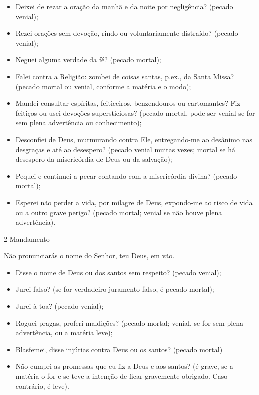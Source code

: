 \documentclass{book}
\begin{document}
\begin{itemize}
    \item Deixei de rezar a oração da manhã e da noite por negligência? (pecado venial);
    \item Rezei orações sem devoção, rindo ou voluntariamente distraído? (pecado venial);
    \item Neguei alguma verdade da fé? (pecado mortal);
    \item Falei contra a Religião: zombei de coisas santas, p.ex., da Santa Missa? (pecado mortal ou venial, conforme a matéria e o modo);
    \item Mandei consultar espíritas, feiticeiros, benzendouros ou cartomantes? Fiz feitiços ou usei devoções supersticiosas? (pecado mortal, pode ser venial se for sem plena advertência ou conhecimento);
    \item Desconfiei de Deus, murmurando contra Ele, entregando-me ao desânimo nas desgraças e até ao desespero? (pecado venial muitas vezes; mortal se há desespero da misericórdia de Deus ou da salvação);
    \item Pequei e continuei a pecar contando com a misericórdia divina? (pecado mortal);
    \item Esperei não perder a vida, por milagre de Deus, expondo-me ao risco de vida ou a outro grave perigo? (pecado mortal; venial se não houve plena advertência).
\end{itemize}
\newpage
\begin{center}
    2\textordmasculine{} Mandamento
\end{center}
\begin{flushleft}
    Não pronunciarás o nome do Senhor, teu Deus, em vão.
\end{flushleft}
\begin{itemize}
    \item Disse o nome de Deus ou dos santos sem respeito? (pecado venial);
    \item Jurei falso? (se for verdadeiro juramento falso, é pecado mortal);
    \item Jurei à toa? (pecado venial);
    \item Roguei pragas, proferi maldições? (pecado mortal; venial, se for sem plena advertência, ou a matéria leve);
    \item Blasfemei, disse injúrias contra Deus ou os santos? (pecado mortal)
    \item Não cumpri as promessas que eu fiz a Deus e aos santos? (é grave, se a matéria o for e se teve a intenção de ficar gravemente obrigado. Caso contrário, é leve).
\end{itemize}
\end{document}
